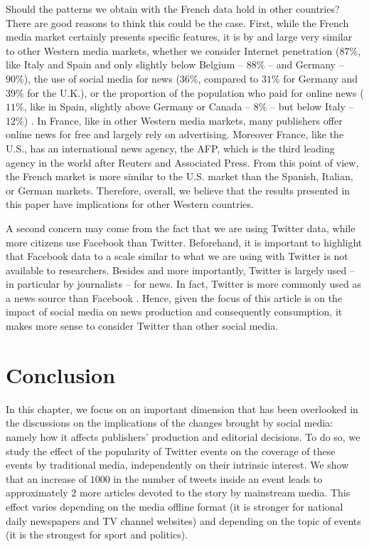 Should the patterns we obtain with the French data hold in other countries? There are good reasons to think this could be the case. First, while the French media market certainly presents specific features, it is by and large very similar to other Western media markets, whether we consider Internet penetration ($87\%$, like Italy and Spain and only slightly below Belgium -- $88\%$ -- and Germany -- $90\%$), the use of social media for news ($36\%$, compared to $31\%$ for Germany and $39\%$ for the U.K.), or the proportion of the population who paid for online news ($11\%$, like in Spain, slightly above Germany or Canada -- $8\%$ -- but below Italy -- $12\%$) \citep{Reuters2018}. In France, like in other Western media markets, many publishers offer online news for free and largely rely on advertising. Moreover France, like the U.S., has an international news agency, the AFP, which is the third leading agency in the world after Reuters and Associated Press. From this point of view, the French market is more similar to the U.S. market than the Spanish, Italian, or German markets. Therefore, overall, we believe that the results presented in this paper have implications for other Western countries.

A second concern may come from the fact that we are using Twitter data, while more citizens use Facebook than Twitter. Beforehand, it is important to highlight that Facebook data to a scale similar to what we are using with Twitter is not available to researchers. Besides and more importantly, Twitter is largely used -- in particular by journalists -- for news. In fact, Twitter is more commonly used as a news source than Facebook \citep{vonNordheimBoczekKoppers2018}. Hence, given the focus of this article is on the impact of social media on news production and consequently consumption, it makes more sense to consider Twitter than other social media.

\section{Conclusion\label{Sec:Conclusion}}

In this chapter, we focus on an important dimension that has been overlooked in the discussions on the implications of the changes brought by social media: namely how it affects publishers' production and editorial decisions. To do so, we study the effect of the popularity of Twitter events on the coverage of these events by traditional media, independently on their intrinsic interest. We show that an increase of $1000$ in the number of tweets inside an event leads to approximately $2$ more articles devoted to the story by mainstream media. This effect varies depending on the media offline format (it is stronger for national daily newspapers and TV channel websites) and depending on the topic of events (it is the strongest for sport and politics).

